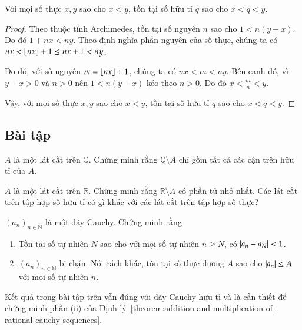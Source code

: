 \begin{theorem}
    Với mọi số thực $x, y$ sao cho $x < y$, tồn tại số hữu tỉ $q$ sao cho $x < q < y$.
\end{theorem}

\begin{proof}
    Theo thuộc tính Archimedes, tồn tại số nguyên $n$ sao cho $1 < n(y - x)$. Do đó $1 + nx < ny$. Theo định nghĩa phần nguyên của số thực, chúng ta có $nx < \left\lfloor{nx}\right\rfloor + 1 \leq nx + 1 < ny$.

    Do đó, với số nguyên $m = \left\lfloor{nx}\right\rfloor + 1$, chúng ta có $nx < m < ny$. Bên cạnh đó, vì $y - x > 0$ và $n > 0$ nên  $1 < n(y - x)$ kéo theo $n > 0$. Do đó $x < \frac{m}{n} < y$.

    Vậy, với mọi số thực $x, y$ sao cho $x < y$, tồn tại số hữu tỉ $q$ sao cho $x < q < y$.
\end{proof}

\subsection{Bài tập}

\begin{exercise}
    $A$ là một lát cắt trên $\mathbb{Q}$. Chứng minh rằng $\mathbb{Q}\setminus A$ chỉ gồm tất cả các cận trên hữu tỉ của $A$.
\end{exercise}

\begin{exercise}
    $A$ là một lát cắt trên $\mathbb{R}$. Chứng minh rằng $\mathbb{R}\setminus A$ có phần tử nhỏ nhất. Các lát cắt trên tập hợp số hữu tỉ có gì khác với các lát cắt trên tập hợp số thực?
\end{exercise}

\begin{exercise}
    ${(a_{n})}_{n\in\mathbb{N}}$ là một dãy Cauchy. Chứng minh rằng
    \begin{enumerate}[label={(\roman*)}]
        \item Tồn tại số tự nhiên $N$ sao cho với mọi số tự nhiên $n\geq N$, có $\left\vert{a_{n} - a_{N}}\right\vert < 1$.
        \item ${(a_{n})}_{n\in\mathbb{N}}$ bị chặn. Nói cách khác, tồn tại số thực dương $A$ sao cho $\left\vert{a_{n}}\right\vert\leq A$ với mọi số tự nhiên $n$.
    \end{enumerate}
\end{exercise}

Kết quả trong bài tập trên vẫn đúng với dãy Cauchy hữu tỉ và là cần thiết để chứng minh phần (ii) của Định lý~\ref{theorem:addition-and-multiplication-of-rational-cauchy-sequences}.

